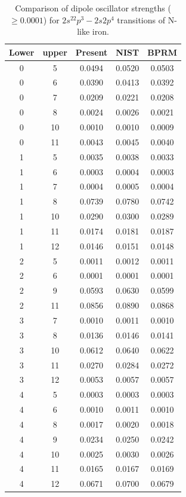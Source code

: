 \documentclass[preprint, floatfix, pra, showpacs, showkeys]{revtex4}
\begin{document}
\begingroup
\squeezetable
\begin{table}
\caption{\label{tab_fe06t}Comparison of dipole oscillator strengths ($\ge
0.0001$) for $2s^22p^3-2s2p^4$ transitions of N-like iron.}
\begin{ruledtabular}
\begin{tabular}{*{5}{c}}
Lower& upper& \multicolumn{1}{c}{Present}& 
\multicolumn{1}{c}{NIST}& \multicolumn{1}{c}{BPRM}\\
\hline
0& 5& 0.0494 & 0.0520& 0.0503\\
0& 6& 0.0390 & 0.0413& 0.0392\\
0& 7& 0.0209 & 0.0221& 0.0208\\
0& 8& 0.0024 & 0.0026& 0.0021\\
0& 10& 0.0010 & 0.0010& 0.0009\\
0& 11& 0.0043 & 0.0045& 0.0040\\
\hline
1& 5& 0.0035 & 0.0038& 0.0033\\
1& 6& 0.0003 & 0.0004& 0.0003\\
1& 7& 0.0004 & 0.0005& 0.0004\\
1& 8& 0.0739 & 0.0780& 0.0742\\
1& 10& 0.0290 & 0.0300& 0.0289\\
1& 11& 0.0174 & 0.0181& 0.0187\\
1& 12& 0.0146 & 0.0151& 0.0148\\
\hline
2& 5& 0.0011 & 0.0012& 0.0011\\
2& 6& 0.0001 & 0.0001& 0.0001\\
2& 9& 0.0593 & 0.0630& 0.0599\\
2& 11& 0.0856 & 0.0890& 0.0868\\
\hline
3& 7& 0.0010 & 0.0011& 0.0010\\
3& 8& 0.0136 & 0.0146& 0.0141\\
3& 10& 0.0612 & 0.0640& 0.0622\\
3& 11& 0.0270 & 0.0284& 0.0272\\
3& 12& 0.0053 & 0.0057& 0.0057\\
\hline
4& 5& 0.0003 & 0.0003& 0.0003\\
4& 6& 0.0010 & 0.0011& 0.0010\\
4& 8& 0.0017 & 0.0020& 0.0018\\
4& 9& 0.0234 & 0.0250& 0.0242\\
4& 10& 0.0025 & 0.0030& 0.0026\\
4& 11& 0.0165 & 0.0167& 0.0169\\
4& 12& 0.0671 & 0.0700& 0.0679\\
\end{tabular}
\end{ruledtabular}
\end{table}
\endgroup
\end{document}
